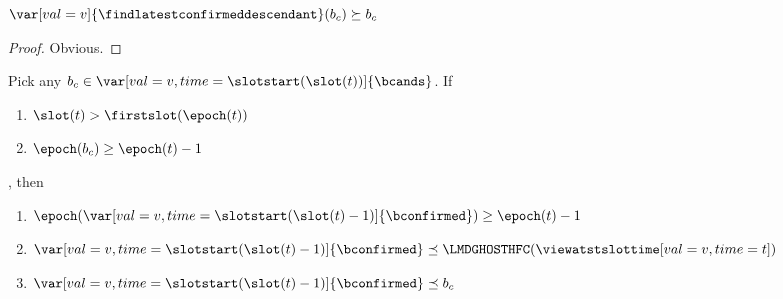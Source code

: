 \documentclass{article}
\begin{document}
\begin{lemma}\label{lem:out-find-latest-conf-descendant-output}
    $\var[val=v]{\findlatestconfirmeddescendant}(b_c) \succeq b_c$
\end{lemma}
\begin{proof}
    Obvious.
\end{proof}

\begin{lemma}\label{lem:prev-conf-at-least-e-1}
    Pick any $b_c \in  \var[val=v,time=\slotstart(\slot(t))]{\bcands}$.
    If
    \begin{enumerate}
        \item $\slot(t) > \text{\firstslot}(\epoch(t))$
        \item $\epoch(b_c) \geq \epoch(t)-1$
    \end{enumerate},
    then
    \begin{enumerate}
        \item $\epoch(\var[val=v,time=\slotstart(\slot(t)-1)]{\bconfirmed}) \geq \epoch(t)-1$
        \item $\var[val=v,time=\slotstart(\slot(t)-1)]{\bconfirmed} \preceq \LMDGHOSTHFC(\viewatstslottime[val=v,time=t])$
        \item $\var[val=v,time=\slotstart(\slot(t)-1)]{\bconfirmed} \preceq b_c$
    \end{enumerate}
\end{lemma}
\end{document}
